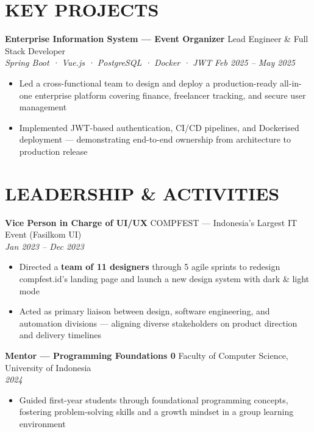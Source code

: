 \documentclass[10pt,a4paper]{article}
\newcommand{\experienceheader}[4]{
    \textbf{#1} \hfill #2 \\
    \textit{#3} \hfill \textit{#4}
}
\begin{document}
\section*{KEY PROJECTS}

\experienceheader{Enterprise Information System — Event Organizer}{Lead Engineer \& Full Stack Developer}{Spring Boot · Vue.js · PostgreSQL · Docker · JWT}{Feb 2025 -- May 2025}
\begin{itemize}[leftmargin=*, itemsep=0.5pt, topsep=1pt]
    \item Led a cross-functional team to design and deploy a production-ready all-in-one enterprise platform covering finance, freelancer tracking, and secure user management
    \item Implemented JWT-based authentication, CI/CD pipelines, and Dockerised deployment — demonstrating end-to-end ownership from architecture to production release
\end{itemize}

\vspace{-4pt}

\section*{LEADERSHIP \& ACTIVITIES}

\experienceheader{Vice Person in Charge of UI/UX}{COMPFEST — Indonesia's Largest IT Event (Fasilkom UI)}{}{Jan 2023 -- Dec 2023}
\begin{itemize}[leftmargin=*, itemsep=0.5pt, topsep=1pt]
    \item Directed a \textbf{team of 11 designers} through 5 agile sprints to redesign compfest.id's landing page and launch a new design system with dark \& light mode
    \item Acted as primary liaison between design, software engineering, and automation divisions — aligning diverse stakeholders on product direction and delivery timelines
\end{itemize}

\vspace{2pt}

\experienceheader{Mentor — Programming Foundations 0}{Faculty of Computer Science, University of Indonesia}{}{2024}
\begin{itemize}[leftmargin=*, itemsep=0.5pt, topsep=1pt]
    \item Guided first-year students through foundational programming concepts, fostering problem-solving skills and a growth mindset in a group learning environment
\end{itemize}
\end{document}

